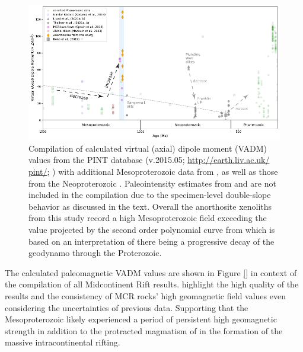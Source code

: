 \documentclass[draft]{agujournal2019}
\begin{document}
\begin{figure}[h!]
\noindent\includegraphics[width=\textwidth]{PINT_compilation.pdf}
\centering
\caption{\footnotesize{Compilation of calculated virtual (axial) dipole moment (VADM) values from the PINT database (v.2015.05; \url{http://earth.liv.ac.uk/ pint/}; ) with additional Mesoproterozoic data from , as well as those from the Neoproterozoic \cite{Lloyd2021a, Lloyd2021b, Thallner2021a, Thallner2021b}. Paleointensity estimates from  and  are not included in the compilation due to the specimen-level double-slope behavior as discussed in the text. Overall the anorthosite xenoliths from this study record a high Mesoproterozoic field exceeding the value projected by the second order polynomial curve from  which is based on an interpretation of there being a progressive decay of the geodynamo through the Proterozoic.}}
\label{fig:MCR_VADM}
\end{figure}



The calculated paleomagnetic VADM values are shown in Figure \ref{} in context of the compilation of all Midcontinent Rift results. highlight the high quality of the results and the consistency of MCR rocks' high geomagnetic field values even considering the uncertainties of previous data. Supporting that the Mesoproterozoic likely experienced a period of persistent high geomagnetic strength in addition to the protracted magmatism of in the formation of the massive intracontinental rifting. 

\end{document}
